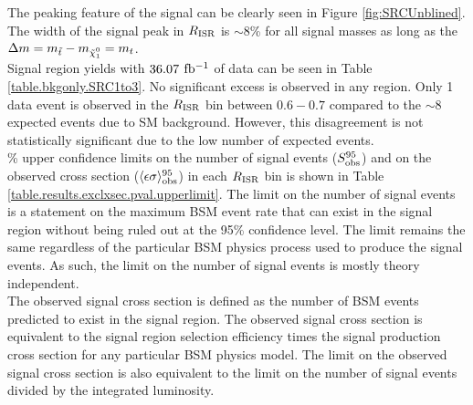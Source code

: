 \indent The peaking feature of the signal can be clearly seen in Figure \ref{fig:SRCUnblined}.  The width of the signal peak in $R_{\mathrm{ISR}}$ is $\sim8$\% for all signal masses as long as the  $\Delta m = m_{\stop} - m_{\ninoone} = m_t$.  \\

\indent Signal region yields with $36.07$ $\mbox{fb$^{-1}$}$ of data can be seen in Table \ref{table.bkgonly.SRC1to3}.  No significant excess is observed in any region.  Only 1 data event is observed in the $R_{\mathrm{ISR}}$ bin between $0.6-0.7$ compared to the $\sim8$ expected events due to SM background.  However, this disagreement is not statistically significant due to the low number of expected events.  \\


%


\% upper confidence limits on the number of signal events ($S_{\rm obs}^{95}$) and on the observed cross section ($\langle\epsilon\sigma\rangle_{\rm obs}^{95}$) in each $R_{\mathrm{ISR}}$ bin is shown in Table \ref{table.results.exclxsec.pval.upperlimit}.   The limit on the number of signal events is a statement on the maximum BSM event rate that can exist in the signal region without being ruled out at the 95\% confidence level.  The limit remains the same regardless of the particular BSM physics process used to produce the signal events. As such, the limit on the number of signal events is mostly theory independent. \\

\indent The observed signal cross section is defined as the number of BSM events predicted to exist in the signal region.  The observed signal cross section is equivalent to the signal region selection efficiency times the signal production cross section for any particular BSM physics model.  The limit on the observed signal cross section is also equivalent to the limit on the number of signal events divided by the integrated luminosity.  \\

